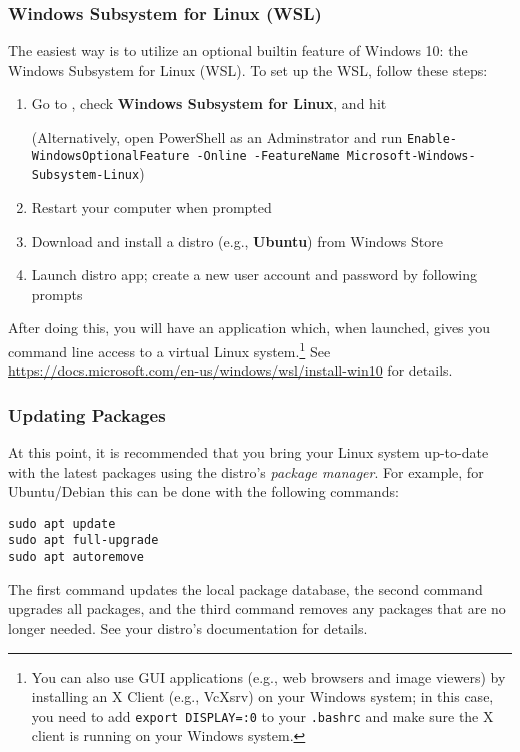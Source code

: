 \documentclass[12pt]{article}
\begin{document}
\subsubsection{Windows Subsystem for Linux (WSL)} \label{sec:wsl}
The easiest way is to utilize an optional builtin feature of Windows 10: the Windows Subsystem for Linux (WSL).
To set up the WSL, follow these steps:
\begin{enumerate}
    \item Go to , check \textbf{Windows Subsystem for Linux}, and hit 

        (Alternatively, open PowerShell as an Adminstrator and run \texttt{Enable-WindowsOptionalFeature -Online -FeatureName Microsoft-Windows-Subsystem-Linux})
    \item Restart your computer when prompted
    \item Download and install a distro (e.g., \textbf{Ubuntu}) from Windows Store
    \item Launch distro app; create a new user account and password by following prompts
\end{enumerate}
After doing this, you will have an application which, when launched, gives you command line access to a virtual Linux system.\footnote{
    You can also use GUI applications (e.g., web browsers and image viewers) by installing an X Client (e.g., VcXsrv) on your Windows system; in this case, you need to add \texttt{export DISPLAY=:0} to your \texttt{.bashrc} and make sure the X client is running on your Windows system.
}
See \url{https://docs.microsoft.com/en-us/windows/wsl/install-win10} for details.

\subsubsection{Updating Packages}
At this point, it is recommended that you bring your Linux system up-to-date with the latest packages using the distro's \emph{package manager}.
For example, for Ubuntu/Debian this can be done with the following commands:
\begin{verbatim}
sudo apt update
sudo apt full-upgrade
sudo apt autoremove
\end{verbatim}
The first command updates the local package database, the second command upgrades all packages, and the third command removes any packages that are no longer needed.
See your distro's documentation for details.
\end{document}
